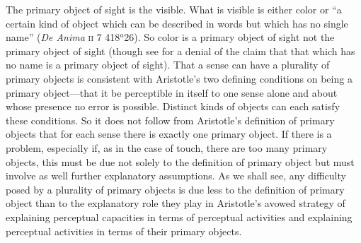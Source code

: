 
The primary object of sight is the visible. What is visible is either color or ``a certain kind of object which can be described in words but which has no single name'' (\emph{De Anima} \textsc{ii} 7 418\( ^{a} \)26). So color is a primary object of sight not the primary object of sight (though see \citealt[252]{Polansky:2007ly} for a denial of the claim that that which has no name is a primary object of sight). That a sense can have a plurality of primary objects is consistent with Aristotle's two defining conditions on being a primary object---that it be perceptible in itself to one sense alone and about whose presence no error is possible. Distinct kinds of objects can each satisfy these conditions. So it does not follow from Aristotle's definition of primary objects that for each sense there is exactly one primary object. If there is a problem, especially if, as in the case of touch, there are too many primary objects, this must be due not solely to the definition of primary object but must involve as well further explanatory assumptions. As we shall see, any difficulty posed by a plurality of primary objects is due less to the definition of primary object than to the explanatory role they play in Aristotle's avowed strategy of explaining perceptual capacities in terms of perceptual activities and explaining perceptual activities in terms of their primary objects.

